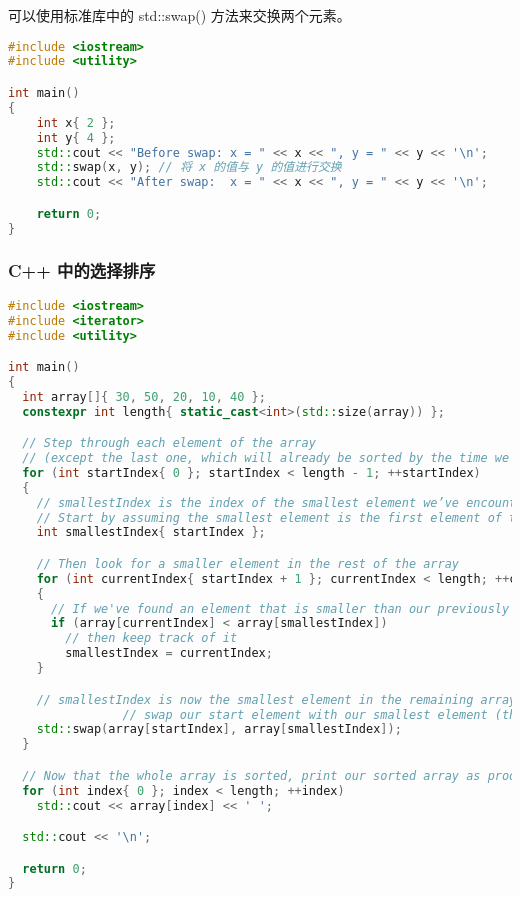 \documentclass[../../LearnCpp.tex]{subfiles}
\begin{document}

可以使用标准库中的 std::swap() 方法来交换两个元素。

\begin{lstlisting}[language=C++]
#include <iostream>
#include <utility>

int main()
{
    int x{ 2 };
    int y{ 4 };
    std::cout << "Before swap: x = " << x << ", y = " << y << '\n';
    std::swap(x, y); // 将 x 的值与 y 的值进行交换
    std::cout << "After swap:  x = " << x << ", y = " << y << '\n';

    return 0;
}
\end{lstlisting}

\subsubsection*{C++ 中的选择排序}

\begin{lstlisting}[language=C++]
#include <iostream>
#include <iterator>
#include <utility>

int main()
{
  int array[]{ 30, 50, 20, 10, 40 };
  constexpr int length{ static_cast<int>(std::size(array)) };

  // Step through each element of the array
  // (except the last one, which will already be sorted by the time we get there)
  for (int startIndex{ 0 }; startIndex < length - 1; ++startIndex)
  {
    // smallestIndex is the index of the smallest element we’ve encountered this iteration
    // Start by assuming the smallest element is the first element of this iteration
    int smallestIndex{ startIndex };

    // Then look for a smaller element in the rest of the array
    for (int currentIndex{ startIndex + 1 }; currentIndex < length; ++currentIndex)
    {
      // If we've found an element that is smaller than our previously found smallest
      if (array[currentIndex] < array[smallestIndex])
        // then keep track of it
        smallestIndex = currentIndex;
    }

    // smallestIndex is now the smallest element in the remaining array
                // swap our start element with our smallest element (this sorts it into the correct place)
    std::swap(array[startIndex], array[smallestIndex]);
  }

  // Now that the whole array is sorted, print our sorted array as proof it works
  for (int index{ 0 }; index < length; ++index)
    std::cout << array[index] << ' ';

  std::cout << '\n';

  return 0;
}
\end{lstlisting}
\end{document}
